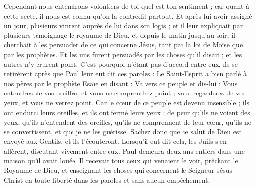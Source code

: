 \begin{multicols}{2}
Cependant nous entendrons volontiers de toi quel est ton sentiment ; car quant à cette secte, il nous est connu qu'on la contredit partout.
Et après lui avoir assigné un jour, plusieurs vinrent auprès de lui dans son logis ; et il leur expliquait par plusieurs témoignage le royaume de Dieu, et depuis le matin jusqu'au soir, il cherchait à les persuader de ce qui concerne Jésus, tant par la loi de Moïse que par les prophètes.
Et les uns furent persuadés par les choses qu'il disait ; et les autres n'y crurent point.
C'est pourquoi n'étant pas d'accord entre eux, ils se retirèrent après que Paul leur eut dit ces paroles : Le Saint-Esprit a bien parlé à nos pères par le prophète Esaïe en disant :
Va vers ce peuple et dis-lui : Vous entendrez de vos oreilles, et vous ne comprendrez point ; vous regarderez de vos yeux, et vous ne verrez point.
Car le cœur de ce peuple est devenu insensible ; ils ont endurci leurs oreilles, et ils ont fermé leurs yeux ; de peur qu'ils ne voient des yeux, qu'ils n'entendent des oreilles, qu'ils ne comprennent de leur cœur, qu'ils ne se convertissent, et que je ne les guérisse.
Sachez donc que ce salut de Dieu est envoyé aux Gentils, et ils l'écouteront.
Lorsqu'il eut dit cela, les Juifs s'en allèrent, discutant vivement entre eux.
Paul demeura deux ans entiers dans une maison qu'il avait louée. Il recevait tous ceux qui venaient le voir,
prêchant le Royaume de Dieu, et enseignant les choses qui concernent le Seigneur Jésus-Christ en toute liberté dans les paroles et sans aucun empêchement.

\PPE{}
\end{multicols}
